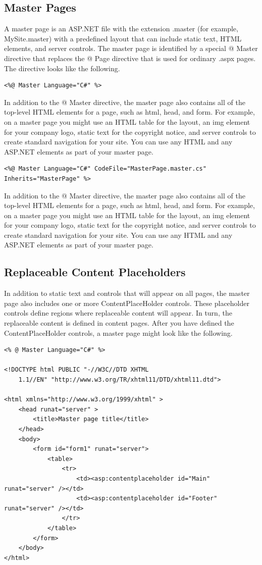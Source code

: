 \subsection{Master Pages}
A master page is an ASP.NET file with the extension .master (for example, MySite.master) with a predefined layout that can include static text, HTML elements, and server controls. The master page is identified by a special @ Master directive that replaces the @ Page directive that is used for ordinary .aspx pages. The directive looks like the following.
\begin{lstlisting}
<%@ Master Language="C#" %>
\end{lstlisting}
In addition to the @ Master directive, the master page also contains all of the top-level HTML elements for a page, such as html, head, and form. For example, on a master page you might use an HTML table for the layout, an img element for your company logo, static text for the copyright notice, and server controls to create standard navigation for your site. You can use any HTML and any ASP.NET elements as part of your master page.
\begin{lstlisting}
<%@ Master Language="C#" CodeFile="MasterPage.master.cs" Inherits="MasterPage" %>
\end{lstlisting}
In addition to the @ Master directive, the master page also contains all of the top-level HTML elements for a page, such as html, head, and form. For example, on a master page you might use an HTML table for the layout, an img element for your company logo, static text for the copyright notice, and server controls to create standard navigation for your site. You can use any HTML and any ASP.NET elements as part of your master page.

\subsection{Replaceable Content Placeholders}
In addition to static text and controls that will appear on all pages, the master page also includes one or more ContentPlaceHolder controls. These placeholder controls define regions where replaceable content will appear. In turn, the replaceable content is defined in content pages. After you have defined the ContentPlaceHolder controls, a master page might look like the following.
\begin{lstlisting}
<% @ Master Language="C#" %>

<!DOCTYPE html PUBLIC "-//W3C//DTD XHTML 
	1.1//EN" "http://www.w3.org/TR/xhtml11/DTD/xhtml11.dtd">

<html xmlns="http://www.w3.org/1999/xhtml" >
	<head runat="server" >
		<title>Master page title</title>
	</head>
	<body>
		<form id="form1" runat="server">
			<table>
				<tr>
					<td><asp:contentplaceholder id="Main" runat="server" /></td>
					<td><asp:contentplaceholder id="Footer" runat="server" /></td>
				</tr>
			</table>
		</form>
	</body>
</html>
\end{lstlisting}

